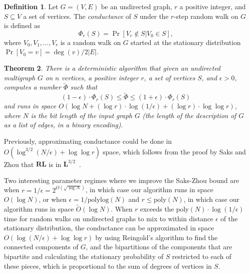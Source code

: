 \documentclass[11pt]{article}
\numberwithin{equation}{section}
\newtheorem{theorem}{Theorem}[section]
\theoremstyle{definition}
\newtheorem{definition}[theorem]{Definition}
\theoremstyle{plain}
\newcommand{\wt}{\widetilde}   %
\newcommand{\SC}{O(\log N + (\log r)\cdot\log(1/\epsilon)+(\log r)\cdot \log\log r)}
\newcommand{\class}[1]{\mathbf{#1}}
\newcommand{\RL}{\class{RL}}
\renewcommand{\L}{\class{L}}
\numberwithin{myalgctr}{section}
\theoremstyle{named}
\begin{document}
\begin{definition}
Let $G=(V,E)$ be an undirected graph, $r$ a positive integer, and $S\subseteq V$ a set of vertices.  The \emph{conductance} of $S$ under the $r$-step random walk on $G$ is defined as 
\[
\Phi_r(S)=\Pr[V_r\not \in S | V_0\in S],
\]
where $V_0,V_1,\ldots,V_r$ is a random walk on $G$ started at the stationary distribution  $\Pr[V_0=v]=\deg(v)/2|E|$.
\end{definition}

\begin{theorem}
\label{thm:conductance}
There is a deterministic algorithm that given an undirected multigraph $G$ on $n$ vertices, a positive integer $r$, a set of vertices $S$, and $\epsilon>0$, computes a number $\wt{\Phi}$ such that
\[
(1-\epsilon)\cdot \Phi_r(S) \leq \wt{\Phi} \leq (1+\epsilon)\cdot \Phi_r(S)
\]
and runs in space $\SC$, where $N$ is the bit length of the input graph $G$ (the length of the description of $G$ as a list of edges, in a binary encoding). 
\end{theorem}

Previously, approximating conductance could be done in $O(\log^{3/2}(N/\epsilon)+\log\log r)$ space, which follows from
%
%
the proof by Saks and Zhou that $\RL$ is in $\L^{3/2}$~\cite{SaksZh99}.  

Two interesting parameter regimes where we improve the Saks-Zhou bound are when $r=1/\epsilon=2^{O(\sqrt{\log N})}$, in which case our algorithm runs in space $O(\log N)$, or when $\epsilon=1/\mathrm{polylog}(N)$ and $r\leq \mathrm{poly}(N)$, in which case our algorithm runs in space $\wt{O}(\log N)$. When $r$ exceeds the $\mathrm{poly}(N)\cdot\log(1/\epsilon)$ time for random walks on undirected graphs to mix to within distance $\epsilon$ of the stationary distribution, the conductance can be approximated in space $O(\log (N/\epsilon)+\log\log r)$ by using Reingold's algorithm to find the connected components of $G$, and the bipartitions of the components that are bipartite and calculating the stationary probability of $S$ restricted to each of these pieces, which is proportional to the sum of degrees of vertices in $S$.  
\end{document}

